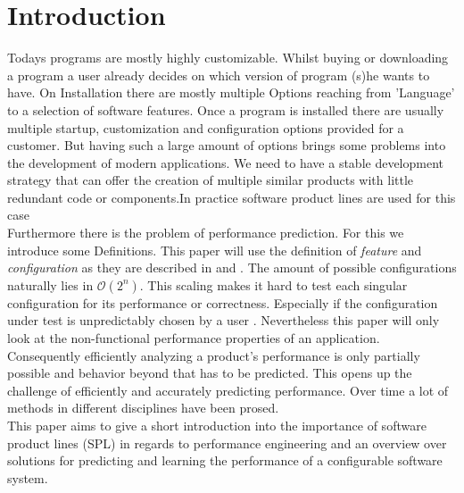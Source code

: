 \section{Introduction}
Todays programs are mostly highly customizable. Whilst buying or downloading a program a user already decides on which version of program (s)he wants to have. On Installation there are mostly multiple Options reaching from 'Language' to a selection of software features. Once a program is installed there are usually multiple startup, customization and configuration options provided for a customer. But having such a large amount of options brings some problems into the development of modern applications. We need to have a stable development strategy that can offer the creation of multiple similar products with little redundant code or components.In practice software product lines are used for this case\\
Furthermore there is the problem of performance prediction. For this we introduce some Definitions.
This paper will use the definition of \textit{feature} and \textit{configuration} as they are described in \cite{PredictingPerformanceAutmatedFeatureDetectionSiegmund2012}  and .
The amount of possible configurations naturally lies in $\mathcal{O}(2^n)$. This scaling makes it hard to test each singular configuration for its performance or correctness. Especially if the configuration under test is unpredictably chosen by a user \cite{PredictingPerformanceAutmatedFeatureDetectionSiegmund2012}. Nevertheless this paper will only look at the non-functional performance properties of an application. Consequently efficiently analyzing a product's performance is only partially possible and behavior beyond that has to be predicted. This opens up the challenge of efficiently and accurately predicting performance. Over time a lot of methods in different disciplines have been prosed.\\
This paper aims to give a short introduction into the importance of software product lines (SPL) in regards to performance engineering and an overview over solutions for predicting and learning the performance of a configurable software system.
